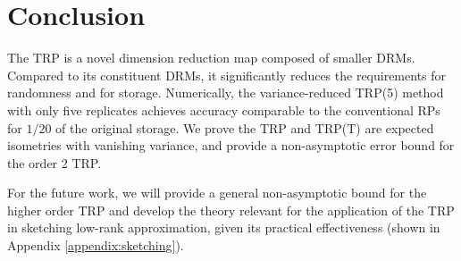 \section{Conclusion}
The TRP is a novel dimension reduction map composed of smaller DRMs.
Compared to its constituent DRMs, it significantly reduces
the requirements for randomness and for storage.
Numerically, the variance-reduced TRP(5) method with only five replicates
achieves accuracy comparable to the conventional RPs for $1/20$ of the original storage.
We prove the TRP and TRP(T) are expected isometries with vanishing variance,
and provide a non-asymptotic error bound for the order 2 TRP.

For the future work, we will provide a general non-asymptotic bound
for the higher order TRP 
and develop the theory relevant for the application of the TRP
in sketching low-rank approximation, given its practical effectiveness
(shown in Appendix \ref{appendix:sketching}).
